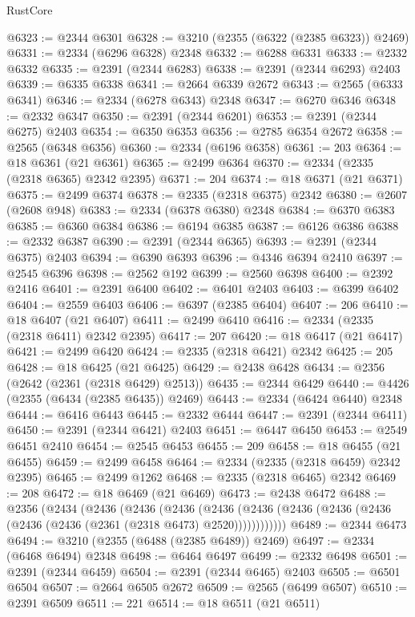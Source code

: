 \begin{lexlean}{RustCore}
\begin{coremodule}
@6323 := @2344 @6301
@6328 := @3210 (@2355 (@6322 (@2385 @6323)) @2469)
@6331 := @2334 (@6296 @6328) @2348
@6332 := @6288 @6331
@6333 := @2332 @6332
@6335 := @2391 (@2344 @6283)
@6338 := @2391 (@2344 @6293) @2403
@6339 := @6335 @6338
@6341 := @2664 @6339 @2672
@6343 := @2565 (@6333 @6341)
@6346 := @2334 (@6278 @6343) @2348
@6347 := @6270 @6346
@6348 := @2332 @6347
@6350 := @2391 (@2344 @6201)
@6353 := @2391 (@2344 @6275) @2403
@6354 := @6350 @6353
@6356 := @2785 @6354 @2672
@6358 := @2565 (@6348 @6356)
@6360 := @2334 (@6196 @6358)
@6361 := 203
@6364 := @18 @6361 (@21 @6361)
@6365 := @2499 @6364
@6370 := @2334 (@2335 (@2318 @6365) @2342 @2395)
@6371 := 204
@6374 := @18 @6371 (@21 @6371)
@6375 := @2499 @6374
@6378 := @2335 (@2318 @6375) @2342
@6380 := @2607 (@2608 @948)
@6383 := @2334 (@6378 @6380) @2348
@6384 := @6370 @6383
@6385 := @6360 @6384
@6386 := @6194 @6385
@6387 := @6126 @6386
@6388 := @2332 @6387
@6390 := @2391 (@2344 @6365)
@6393 := @2391 (@2344 @6375) @2403
@6394 := @6390 @6393
@6396 := @4346 @6394 @2410
@6397 := @2545 @6396
@6398 := @2562 @192
@6399 := @2560 @6398
@6400 := @2392 @2416
@6401 := @2391 @6400
@6402 := @6401 @2403
@6403 := @6399 @6402
@6404 := @2559 @6403
@6406 := @6397 (@2385 @6404)
@6407 := 206
@6410 := @18 @6407 (@21 @6407)
@6411 := @2499 @6410
@6416 := @2334 (@2335 (@2318 @6411) @2342 @2395)
@6417 := 207
@6420 := @18 @6417 (@21 @6417)
@6421 := @2499 @6420
@6424 := @2335 (@2318 @6421) @2342
@6425 := 205
@6428 := @18 @6425 (@21 @6425)
@6429 := @2438 @6428
@6434 := @2356 (@2642 (@2361 (@2318 @6429) @2513))
@6435 := @2344 @6429
@6440 := @4426 (@2355 (@6434 (@2385 @6435)) @2469)
@6443 := @2334 (@6424 @6440) @2348
@6444 := @6416 @6443
@6445 := @2332 @6444
@6447 := @2391 (@2344 @6411)
@6450 := @2391 (@2344 @6421) @2403
@6451 := @6447 @6450
@6453 := @2549 @6451 @2410
@6454 := @2545 @6453
@6455 := 209
@6458 := @18 @6455 (@21 @6455)
@6459 := @2499 @6458
@6464 := @2334 (@2335 (@2318 @6459) @2342 @2395)
@6465 := @2499 @1262
@6468 := @2335 (@2318 @6465) @2342
@6469 := 208
@6472 := @18 @6469 (@21 @6469)
@6473 := @2438 @6472
@6488 := @2356
    (@2434
      (@2436
        (@2436
          (@2436
            (@2436 (@2436 (@2436 (@2436 (@2436 (@2436 (@2436 (@2361 (@2318 @6473) @2520))))))))))))
@6489 := @2344 @6473
@6494 := @3210 (@2355 (@6488 (@2385 @6489)) @2469)
@6497 := @2334 (@6468 @6494) @2348
@6498 := @6464 @6497
@6499 := @2332 @6498
@6501 := @2391 (@2344 @6459)
@6504 := @2391 (@2344 @6465) @2403
@6505 := @6501 @6504
@6507 := @2664 @6505 @2672
@6509 := @2565 (@6499 @6507)
@6510 := @2391 @6509
@6511 := 221
@6514 := @18 @6511 (@21 @6511)

\end{coremodule}
\end{lexlean}
